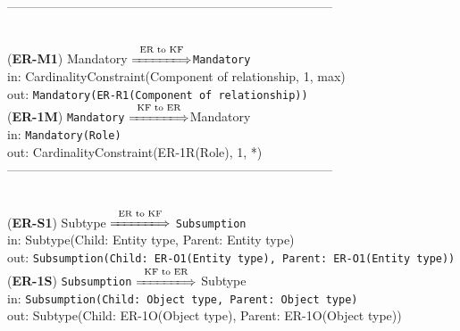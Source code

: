 \documentclass[sn-mathphys]{sn-jnl}
\begin{document}
{{{------------------------------------------------------------------------------
\\ \

({\bf ER-M1}) Mandatory $\overset{\text{ER to KF}}{\xLongrightarrow{\hspace*{1.4cm}}}${\tt Mandatory}\\
\hspace*{0.3cm}in: CardinalityConstraint(Component of relationship, 1, max)\\
\hspace*{0.5cm}out: {\tt Mandatory(ER-R1(Component of relationship))}\\

({\bf ER-1M}) {\tt Mandatory} $\overset{\text{KF to ER}}{\xLongrightarrow{\hspace*{1.4cm}}}${Mandatory}\\
\hspace*{0.3cm}in: {\tt Mandatory(Role)}\\
\hspace*{0.5cm}out: {CardinalityConstraint(ER-1R(Role), 1, *)}\\

------------------------------------------------------------------------------
\\ \

({\bf ER-S1}) {Subtype} $\overset{\text{ER to KF}}{\xLongrightarrow{\hspace*{1.4cm}}}$ {\tt Subsumption}\\
\hspace*{0.3cm}in: {Subtype(Child: Entity type, Parent: Entity type)} \\
\hspace*{0.5cm}out:  {\tt Subsumption(Child: ER-O1(Entity type), Parent: ER-O1(Entity type))}\\


({\bf ER-1S}) {\tt Subsumption} $\overset{\text{KF to ER}}{\xLongrightarrow{\hspace*{1.4cm}}}$ {Subtype}\\
\hspace*{0.3cm}in: {\tt Subsumption(Child: Object type, Parent: Object type)} \\
\hspace*{0.5cm}out:  {Subtype(Child: ER-1O(Object type), Parent: ER-1O(Object type))}\\
 
}}}
\end{document}
